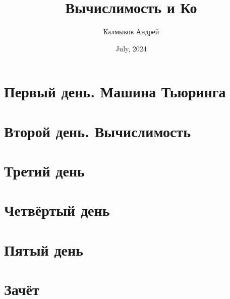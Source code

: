 \documentclass[a4paper, 12pt]{article}
\title{Вычислимость и Ко}
\author{Калмыков Андрей}
\date{July, 2024}
\begin{document}
\maketitle
\tableofcontents
\newpage

\section{Первый день. Машина Тьюринга}


\section{Второй день. Вычислимость}


\section{Третий день}


\section{Четвёртый день}


\section{Пятый день}


\section{Зачёт}

\end{document}

